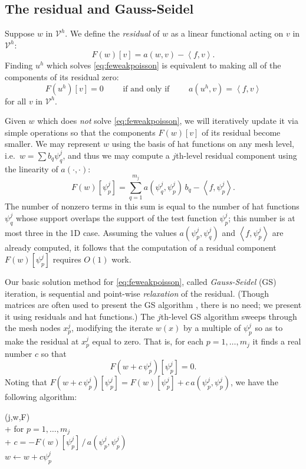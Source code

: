 \documentclass[letterpaper,final,12pt,reqno]{amsart}
\theoremstyle{claim}
\newcommand{\ip}[2]{\left<#1,#2\right>}
\numberwithin{equation}{section}
\numberwithin{figure}{section}
\numberwithin{table}{section}
\numberwithin{theorem}{section}
\begin{document}
\subsection*{The residual and Gauss-Seidel}  Suppose $w$ in $\mathcal{V}^h$.  We define the \emph{residual} of $w$ as a linear functional acting on $v$ in $\mathcal{V}^h$:
\begin{equation}
  F(w)[v] = a(w,v) - \ip{f}{v}.  \label{eq:residual}
\end{equation}
Finding $u^h$ which solves \eqref{eq:feweakpoisson} is equivalent to making all of the components of its residual zero:
\begin{equation}
  F(u^h)[v]=0 \qquad \text{ if and only if } \qquad a(u^h,v)=\ip{f}{v} \label{eq:residualweakequivalence}
\end{equation}
for all $v$ in $\mathcal{V}^h$.

Given $w$ which does \emph{not} solve \eqref{eq:feweakpoisson}, we will iteratively update it via simple operations so that the components $F(w)[v]$ of its residual become smaller.  We may represent $w$ using the basis of hat functions on any mesh level, i.e.~$w = \sum b_q \psi_q^j$, and thus we may compute a $j$th-level residual component using the linearity of $a(\cdot,\cdot)$:
\begin{equation}
  F(w)[\psi_p^j] = \sum_{q=1}^{m_j} a(\psi_q^j,\psi_p^j) \,b_q - \ip{f}{\psi_p^j}.  \label{eq:residualpoisson}
\end{equation}
The number of nonzero terms in this sum is equal to the number of hat functions $\psi_q^j$ whose support overlaps the support of the test function $\psi_p^j$; this number is at most three in the 1D case.  Assuming the values $a(\psi_p^j,\psi_q^j)$ and $\ip{f}{\psi_p^j}$ are already computed, it follows that the computation of a residual component $F(w)[\psi_p^j]$ requires $O(1)$ work.

Our basic solution method for \eqref{eq:feweakpoisson}, called \emph{Gauss-Seidel} (GS) iteration, is sequential and point-wise \emph{relaxation} of the residual.  (Though matrices are often used to present the GS algorithm \cite[for example]{Bueler2021,Greenbaum1997}, there is no need; we present it using residuals and hat functions.)  The $j$th-level GS algorithm sweeps through the mesh nodes $x_p^j$, modifying the iterate $w(x)$ by a multiple of $\psi_p^j$ so as to make the residual at $x_p^j$ equal to zero.  That is, for each $p=1,\dots,m_j$ it finds a real number $c$ so that
\begin{equation}
  F(w+c\,\psi_p^j)[\psi_p^j] = 0.  \label{eq:gaussseidelpoint}
\end{equation}
Noting that $F(w+c\,\psi_p^j)[\psi_p^j] = F(w)[\psi_p^j] + c\, a(\psi_p^j,\psi_p^j)$, we have the following algorithm:
\begin{pseudo*}
(j,w,F)\text{:} \\+
    for $p=1,\dots,m_j$ \\+
        $\displaystyle c = - F(w)[\psi_p^j]\, \big/ \,a(\psi_p^j,\psi_p^j)$  \\
        $w \gets w + c \psi_p^j$
\end{pseudo*}
\end{document}
